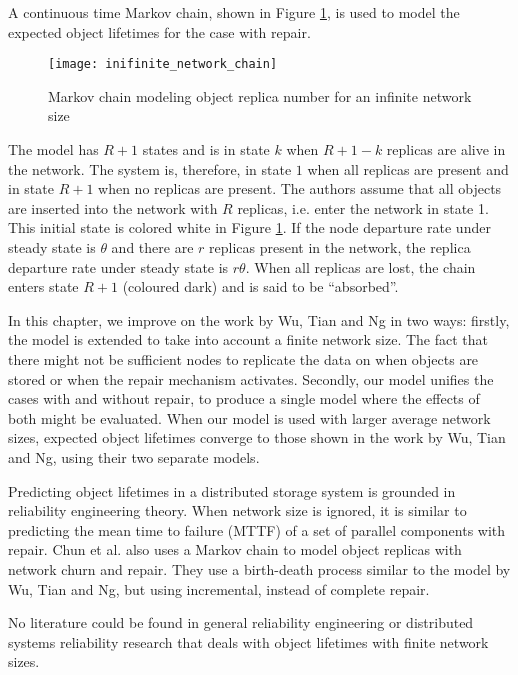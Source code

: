 A continuous time Markov chain, shown in Figure \ref{fig_other_markov_chain}, is used to model the expected object lifetimes for the case with repair.
%
\begin{figure}[htbp]
 \centering
 \texttt{[image: inifinite\_network\_chain]}
 \caption{Markov chain modeling object replica number for an infinite network size}
 \label{fig_other_markov_chain}
\end{figure}
%
The model has $R+1$ states and is in state $k$ when $R+1-k$ replicas are alive in the network. The system is, therefore, in state $1$ when all replicas are present and in state $R+1$ when no replicas are present. The authors assume that all objects are inserted into the network with $R$ replicas, i.e. enter the network in state 1. This initial state is colored white in Figure \ref{fig_other_markov_chain}. If the node departure rate under steady state is $\theta$ and there are $r$ replicas present in the network, the replica departure rate under steady state is $r\theta$. When all replicas are lost, the chain enters state $R+1$ (coloured dark) and is said to be ``absorbed''.

In this chapter, we improve on the work by Wu, Tian and Ng \cite{replication_article} in two ways: firstly, the model is extended to take into account a finite network size. The fact that there might not be sufficient nodes to replicate the data on when objects are stored or when the repair mechanism activates. Secondly, our model unifies the cases with and without repair, to produce a single model where the effects of both might be evaluated. When our model is used with larger average network sizes, expected object lifetimes converge to those shown in the work by Wu, Tian and Ng, using their two separate models.

Predicting object lifetimes in a distributed storage system is grounded in reliability engineering theory. When network size is ignored, it is similar to predicting the mean time to failure (MTTF) of a set of parallel components with repair. Chun et al. \cite{Chun:2006_replica_maintenance} also uses a Markov chain to model object replicas with network churn and repair. They use a birth-death process similar to the model by Wu, Tian and Ng, but using incremental, instead of complete repair.

No literature could be found in general reliability engineering or distributed systems reliability research that deals with object lifetimes with finite network sizes.

